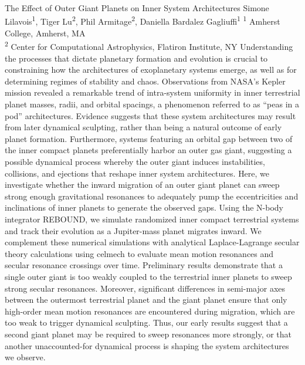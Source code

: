 \makeabstract
    {
    The Effect of Outer Giant Planets on Inner System Architectures
    }
    {
    Simone Lilavois\textsuperscript{1}, Tiger Lu\textsuperscript{2}, Phil Armitage\textsuperscript{2}, Daniella Bardalez Gagliuffi\textsuperscript{1}
    }
    {
    \textsuperscript{1} Amherst College, Amherst, MA\\
\textsuperscript{2} Center for Computational Astrophysics, Flatiron Institute, NY
    }
    {
    Understanding the processes that dictate planetary formation and evolution is crucial to constraining how the architectures of exoplanetary systems emerge, as well as for determining regimes of stability and chaos. Observations from NASA{\textquoteright}s Kepler mission revealed a remarkable trend of intra-system uniformity in inner terrestrial planet masses, radii, and orbital spacings, a phenomenon referred to as {\textquotedblleft}peas in a pod{\textquotedblright} architectures. Evidence suggests that these system architectures may result from later dynamical sculpting, rather than being a natural outcome of early planet formation. Furthermore, systems featuring an orbital gap between two of the inner compact planets preferentially harbor an outer gas giant, suggesting a possible dynamical process whereby the outer giant induces instabilities, collisions, and ejections that reshape inner system architectures. 
    }
    {
    Here, we investigate whether the inward migration of an outer giant planet can sweep strong enough gravitational resonances to adequately pump the eccentricities and inclinations of inner planets to generate the observed gaps. Using the N-body integrator REBOUND, we simulate randomized inner compact terrestrial systems and track their evolution as a Jupiter-mass planet migrates inward. We complement these numerical simulations with analytical Laplace-Lagrange secular theory calculations using celmech to evaluate mean motion resonances and secular resonance crossings over time.
    }
    {
    Preliminary results demonstrate that a single outer giant is too weakly coupled to the terrestrial inner planets to sweep strong secular resonances. Moreover, significant differences in semi-major axes between the outermost terrestrial planet and the giant planet ensure that only high-order mean motion resonances are encountered during migration, which are too weak to trigger dynamical sculpting. 
    }
    {
    Thus, our early results suggest that a second giant planet may be required to sweep resonances more strongly, or that another unaccounted-for dynamical process is shaping the system architectures we observe. 
    }

    \newpage
    